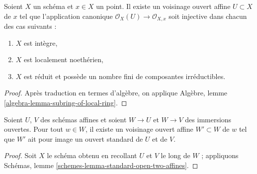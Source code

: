 \begin{lemma}
\label{lemma-ring-affine-open-injective-local-ring}
Soient $X$ un schéma et $x \in X$ un point. Il existe un voisinage
ouvert affine $U \subset X$ de $x$ tel que l'application canonique
$\mathcal{O}_X(U) \to \mathcal{O}_{X, x}$ soit injective dans
chacun des cas suivants :
\begin{enumerate}
\item $X$ est intègre,
\item $X$ est localement noethérien,
\item $X$ est réduit et possède un nombre fini de composantes irréductibles.
\end{enumerate}
\end{lemma}

\begin{proof}
Après traduction en termes d'algèbre, on applique
Algèbre, lemme \ref{algebra-lemma-subring-of-local-ring}.
\end{proof}

\begin{lemma}
\label{lemma-standard-open-two-affines}
Soient $U$, $V$ des schémas affines et soient $W \to U$ et $W \to V$
des immersions ouvertes. Pour tout $w \in W$, il existe un
voisinage ouvert affine $W' \subset W$ de $w$ tel que $W'$
ait pour image un ouvert standard de $U$ et de $V$.
\end{lemma}

\begin{proof}
Soit $X$ le schéma obtenu en recollant $U$ et $V$ le long de $W$ ;
appliquons Schémas, lemme \ref{schemes-lemma-standard-open-two-affines}.
\end{proof}













